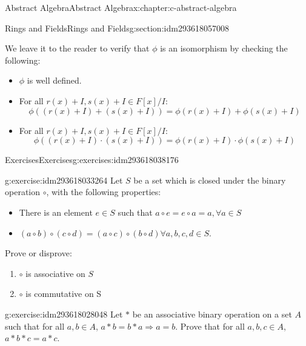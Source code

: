 \documentclass[twoside,10pt,]{book}
\numberwithin{equation}{section}
\begin{document}
\begin{chapterptx}{Abstract Algebra}{}{Abstract Algebra}{}{}{x:chapter:c-abstract-algebra}
\begin{sectionptx}{Rings and Fields}{}{Rings and Fields}{}{}{g:section:idm293618057008}
\begin{equation*}
\end{equation*}
%
\par
We leave it to the reader to verify that \(\phi\) is an isomorphism by checking the following:%
\begin{itemize}[label=\textbullet]
\item{}\(\phi\) is well defined.%
\item{}For all \(r(x)+I, s(x)+I  \in F[x]/I\):%
\begin{equation*}
\phi((r(x)+I)+(s(x)+I))= \phi(r(x)+I)+\phi(s(x)+I)
\end{equation*}
%
\item{}For all \(r(x)+I, s(x)+I  \in F[x]/I\):%
\begin{equation*}
\phi((r(x)+I)\cdot (s(x)+I))= \phi(r(x)+I)\cdot \phi(s(x)+I)
\end{equation*}
%
\end{itemize}
%
\end{sectionptx}
%
%
\typeout{************************************************}
\typeout{************************************************}
%
\begin{exercises-section}{Exercises}{}{Exercises}{}{}{g:exercises:idm293618038176}
\begin{divisionexercise}{1}{}{}{g:exercise:idm293618033264}%
Let \(S\) be a set which is closed under the binary operation \(\circ\), with the following properties:%
\begin{itemize}[label=\textbullet]
\item{}There is an element \(e \in S\) such that \(a \circ e = e\circ a=a, \forall a\in S\)%
\item{}\((a \circ b) \circ (c \circ d) = (a \circ c) \circ (b \circ d) \forall a,b,c,d \in  S\).%
\end{itemize}
%
\par
Prove or disprove:%
\begin{enumerate}[label=(\alph*)]
\item{}\(\circ\)  is associative on \(S\)%
\item{}\(\circ\)  is commutative on S%
\end{enumerate}
%
\end{divisionexercise}%
\begin{divisionexercise}{2}{}{}{g:exercise:idm293618028048}%
Let \(*\) be an associative binary operation on a set \(A\) such that for all \(a, b \in A\), \(a*b=b*a \Rightarrow a=b\).  Prove that for all \(a, b, c \in A\), \(a*b*c = a*c\).%
\end{divisionexercise}%

\end{exercises-section}
\end{chapterptx}
\end{document}

